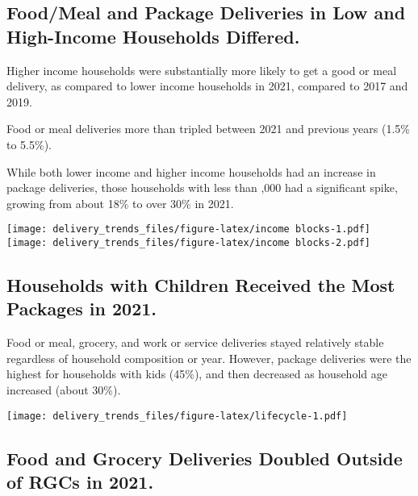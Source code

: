 \documentclass[
  12pt,
]{article}
\begin{document}
\begin{flushleft}
{\subsection{Food/Meal and Package Deliveries in Low and High-Income
Households
Differed.}\label{foodmeal-and-package-deliveries-in-low-and-high-income-households-differed.}}

\begin{flushleft}
Higher income households were substantially more likely to get a good or meal delivery,
as compared to lower income households in 2021, compared to 2017 and 2019.

Food or meal deliveries more than tripled between 2021 and previous years (1.5\% to 5.5\%).

While both lower income and higher income households had an increase in package deliveries,
those households with less than ,000 had a significant spike, growing from
about 18\% to over 30\% in 2021.

\end{flushleft}

\texttt{[image: delivery\_trends\_files/figure-latex/income blocks-1.pdf]}
\texttt{[image: delivery\_trends\_files/figure-latex/income blocks-2.pdf]}

\hypertarget{households-with-children-received-the-most-packages-in-2021.}{%
\subsection{Households with Children Received the Most Packages in
2021.}\label{households-with-children-received-the-most-packages-in-2021.}}

\begin{flushleft}
Food or meal, grocery, and work or service deliveries stayed relatively stable regardless of household composition
or year. However, package deliveries were the highest for households with kids (45\%), and then decreased as household age increased (about 30\%).
\end{flushleft}

\texttt{[image: delivery\_trends\_files/figure-latex/lifecycle-1.pdf]}

\hypertarget{food-and-grocery-deliveries-doubled-outside-of-rgcs-in-2021.}{%
\subsection{Food and Grocery Deliveries Doubled Outside of RGCs in
2021.}\label{food-and-grocery-deliveries-doubled-outside-of-rgcs-in-2021.}}


\end{flushleft}
\end{document}
